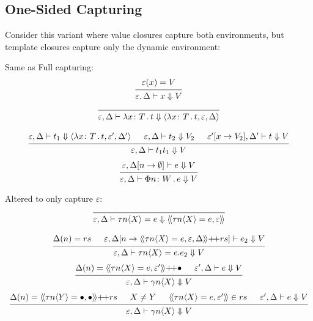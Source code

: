 \documentclass{article}
\newcommand{\la}{\langle}
\newcommand{\ra}{\rangle}
\newcommand{\lda}{\langle\!\langle}
\newcommand{\rda}{\rangle\!\rangle}
\newcommand{\ve}{\varepsilon}
\newcommand{\de}{\Delta}
\newcommand{\hole}{\bullet}
\newcommand{\st}{\,.\,}
\newcommand{\cl}{{\colon}}
\newcommand{\pp}{{+}\!{+}}
\newcommand{\da}{\Downarrow}
\newcommand{\vd}{\vdash}
\begin{document}
\subsection{One-Sided Capturing}

Consider this variant where value closures capture both environments, but template closures capture only the dynamic environment:

Same as Full capturing:
\begin{displaymath}
  \begin{array}{c}
    \begin{prooftree}
      \hypo{\ve(x) = V}
      \infer1{\ve,\de \vd x \da V}
    \end{prooftree}
    \\[15pt]
    \begin{prooftree}
      \infer0{\ve ,\de \vd \lambda x\cl T\st t \da \la \lambda x\cl T\st t , \ve, \de \ra}
    \end{prooftree}
    \\[15pt]
    \begin{prooftree}
      \hypo{\ve,\de \vd t_1 \da \la \lambda x \cl T\st t, \ve', \de' \ra}
      \hypo{\ve,\de \vd t_2 \da V_2}
      \hypo{\ve'[x \to V_2],\de' \vd t \da V}
      \infer3{\ve,\de \vd t_1t_1 \da V}
    \end{prooftree}
    \\[15pt]
    \begin{prooftree}
      \hypo{\ve,\de[n \to \emptyset] \vd e \da V}
      \infer1{\ve,\de \vd \Phi n \cl W \st e \da V}
    \end{prooftree}
  \end{array}
\end{displaymath}

Altered to only capture $\ve$:
\begin{displaymath}
  \begin{array}{c}
    \begin{prooftree}
      \infer0{\ve,\de \vd \tau n\la X\ra = e \da \lda \tau n\la X\ra = e , \ve\rda}
    \end{prooftree}
    \\[15pt]
    \begin{prooftree}
      \hypo{\de(n) = rs}
      \hypo{\ve,\de[n \to \lda \tau n\la X\ra = e , \ve, \de \rda \pp rs] \vd e_2 \da V}
      \infer2{\ve,\de \vd \tau n\la X\ra = e . e_2 \da V}
    \end{prooftree}
    \\[15pt]
    \begin{prooftree}
      \hypo{\de(n) = \lda \tau n\la X\ra = e , \ve' \rda \pp \hole}
      \hypo{\ve',\de \vd e \da V}
      \infer2{\ve,\de\vd \gamma n \la X \ra \da V}
    \end{prooftree}
    \\[15pt]
    \begin{prooftree}
      \hypo{\de(n) = \lda \tau n\la Y\ra = \hole , \hole\rda \pp rs}
      \hypo{X \neq Y}
      \hypo{\lda \tau n\la X\ra = e , \ve' \rda \in rs}
      \hypo{\ve',\de \vd e \da V}
      \infer4{\ve,\de\vd \gamma n \la X \ra \da V}
    \end{prooftree}
  \end{array}
\end{displaymath}
\end{document}
